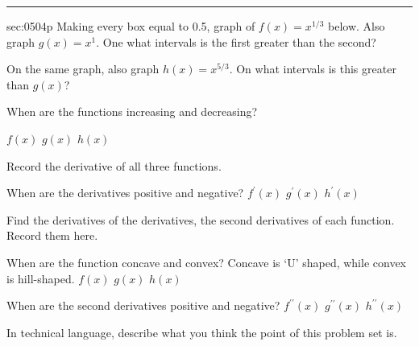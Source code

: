 \renewcommand{\columnseprule}{1.5pt}
\begin{multicols*}{2}
\rule[0.5\baselineskip]{0.4\textwidth}{1pt}
\noindent
{}\label{sec:0504p}
\begin{exercises}{sec:0504p}
\lab{} Making every box equal to 0.5, graph of $f(x)=x^{1/3}$ below.  Also graph $g(x)=x^1$.  One what intervals is the first greater than the second?

\noindent
{}

\vspace{3cm}
\lab{} On the same graph, also graph $h(x)=x^{5/3}$.  On what intervals is this greater than $g(x)$?

\vspace{3cm}
\lab{} When are the functions increasing and decreasing?

\subprob $f(x)$
\subprob $g(x)$
\subprob $h(x)$

\lab{}  Record the derivative of all three functions.



\vspace{4cm}
\lab{}  When are the derivatives positive and negative?
\subprob $f^\prime(x)$
\subprob $g^\prime(x)$
\subprob $h^\prime(x)$

\lab{}  Find the derivatives of the derivatives, the second derivatives of each function.  Record them here.


\vspace{4cm}
\lab{} When are the function concave and convex?  Concave is ‘U’ shaped, while convex is hill-shaped.
\subprob $f(x)$
\subprob $g(x)$
\subprob $h(x)$

\lab{} When are the second derivatives positive and negative?
\subprob $f^{\prime\prime}(x)$
\subprob $g^{\prime\prime}(x)$
\subprob $h^{\prime\prime}(x)$

\lab{} In technical language, describe what you think the point of this problem set is.


\end{exercises}
\end{multicols*}